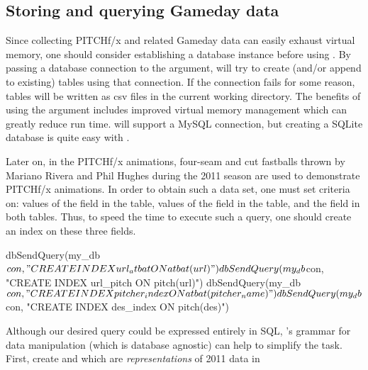 \begin{article}
\section{Storing and querying Gameday data}

Since collecting PITCHf/x and related Gameday data can easily exhaust
virtual memory, one should consider establishing a database instance
before using . By passing a database connection to the
 argument,  will try to create (and/or
append to existing) tables using that connection. If the connection
fails for some reason, tables will be written as csv files in the
current working directory. The benefits of using the 
argument includes improved virtual memory management which can greatly
reduce run time.  will support a MySQL connection, but
creating a SQLite database is quite easy with  \citep{dplyr}. 
%
\begin{Schunk}
\end{Schunk}
%
Later on, in the PITCHf/x animations, four-seam and cut fastballs
thrown by Mariano Rivera and Phil Hughes during the 2011 season are
used to demonstrate PITCHf/x animations. In order to obtain such a
data set, one must set criteria on: values of the 
field in the  table, values of the  field
in the  table, and the  field in both tables.
Thus, to speed the time to execute such a query, one should create
an index on these three fields.
%
\begin{Schunk}
\begin{Sinput}
dbSendQuery(my_db$con, "CREATE INDEX url_atbat ON atbat(url)") 
dbSendQuery(my_db$con, "CREATE INDEX url_pitch ON pitch(url)") 
dbSendQuery(my_db$con, "CREATE INDEX pitcher_index ON atbat(pitcher_name)") 
dbSendQuery(my_db$con, "CREATE INDEX des_index ON pitch(des)")
\end{Sinput}
\end{Schunk}
%
Although our desired query could be expressed entirely in SQL,
's grammar for data manipulation (which is database
agnostic) can help to simplify the task. First, create 
and  which are \emph{representations} of 2011 data in

\end{article}

